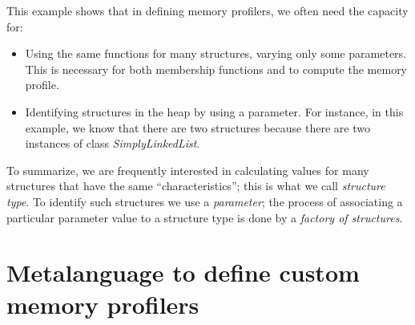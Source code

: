 This example shows that in defining memory profilers, we often need the capacity for:

\begin{itemize}
\item Using the same functions for many structures, varying only some parameters. This is necessary for both membership functions and to compute the memory profile.

\item Identifying structures in the heap by using a parameter. For instance, in this example, we know that there are two structures because there are two instances of class \textit{SimplyLinkedList}.
\end{itemize}

To summarize, we are frequently interested in calculating values for many structures that have the same ``characteristics''; this is what we call \textit{structure type}.
To identify such structures we use a \textit{parameter}; the process of associating a particular parameter value to a structure type is done by a \textit{factory of structures}. 

\section{Metalanguage to define custom memory profilers}\label{sec:approach}






